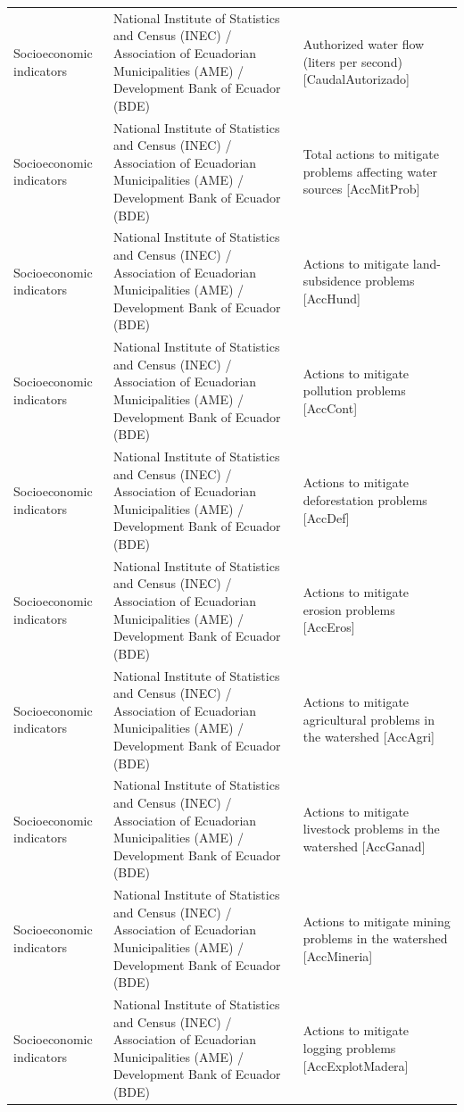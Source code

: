 \begin{landscape}
\begin{longtable}[t]{>{\raggedright\arraybackslash}p{3.4cm}>{\raggedright\arraybackslash}p{5.6cm}>{\raggedright\arraybackslash}p{12.4cm}}
Socioeconomic indicators & National Institute of Statistics and Census (INEC) / Association of Ecuadorian Municipalities (AME) / Development Bank of Ecuador (BDE) & Authorized water flow (liters per second) [CaudalAutorizado]\\
Socioeconomic indicators & National Institute of Statistics and Census (INEC) / Association of Ecuadorian Municipalities (AME) / Development Bank of Ecuador (BDE) & Total actions to mitigate problems affecting water sources [AccMitProb]\\
Socioeconomic indicators & National Institute of Statistics and Census (INEC) / Association of Ecuadorian Municipalities (AME) / Development Bank of Ecuador (BDE) & Actions to mitigate land-subsidence problems [AccHund]\\
Socioeconomic indicators & National Institute of Statistics and Census (INEC) / Association of Ecuadorian Municipalities (AME) / Development Bank of Ecuador (BDE) & Actions to mitigate pollution problems [AccCont]\\
Socioeconomic indicators & National Institute of Statistics and Census (INEC) / Association of Ecuadorian Municipalities (AME) / Development Bank of Ecuador (BDE) & Actions to mitigate deforestation problems [AccDef]\\
Socioeconomic indicators & National Institute of Statistics and Census (INEC) / Association of Ecuadorian Municipalities (AME) / Development Bank of Ecuador (BDE) & Actions to mitigate erosion problems [AccEros]\\
Socioeconomic indicators & National Institute of Statistics and Census (INEC) / Association of Ecuadorian Municipalities (AME) / Development Bank of Ecuador (BDE) & Actions to mitigate agricultural problems in the watershed [AccAgri]\\
Socioeconomic indicators & National Institute of Statistics and Census (INEC) / Association of Ecuadorian Municipalities (AME) / Development Bank of Ecuador (BDE) & Actions to mitigate livestock problems in the watershed [AccGanad]\\
Socioeconomic indicators & National Institute of Statistics and Census (INEC) / Association of Ecuadorian Municipalities (AME) / Development Bank of Ecuador (BDE) & Actions to mitigate mining problems in the watershed [AccMineria]\\
Socioeconomic indicators & National Institute of Statistics and Census (INEC) / Association of Ecuadorian Municipalities (AME) / Development Bank of Ecuador (BDE) & Actions to mitigate logging problems [AccExplotMadera]\\

\end{longtable}
\end{landscape}
